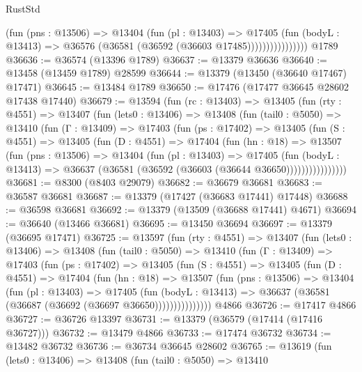 \begin{lexlean}{RustStd}
\begin{coremodule}
                        (fun (pns : @13506) =>
                        @13404
                          (fun (pl : @13403) =>
                          @17405
                            (fun (bodyL : @13413) =>
                            @36576 (@36581 (@36592 (@36603 @17485))))))))))))))))
    @1789
@36636 := @36574 (@13396 @1789)
@36637 := @13379 @36636
@36640 := @13458 (@13459 @1789) @28599
@36644 := @13379 (@13450 (@36640 @17467) @17471)
@36645 := @13484 @1789
@36650 := @17476 (@17477 @36645 @28602 @17438 @17440)
@36679 := @13594
    (fun (rc : @13403) =>
    @13405
      (fun (rty : @4551) =>
      @13407
        (fun (lets0 : @13406) =>
        @13408
          (fun (tail0 : @5050) =>
          @13410
            (fun (Γ : @13409) =>
            @17403
              (fun (ps : @17402) =>
              @13405
                (fun (S : @4551) =>
                @13405
                  (fun (D : @4551) =>
                  @17404
                    (fun (hn : @18) =>
                    @13507
                      (fun (pns : @13506) =>
                      @13404
                        (fun (pl : @13403) =>
                        @17405
                          (fun (bodyL : @13413) =>
                          @36637 (@36581 (@36592 (@36603 (@36644 @36650))))))))))))))))
@36681 := @8300 (@8403 @29079)
@36682 := @36679 @36681
@36683 := @36587 @36681
@36687 := @13379 (@17427 (@36683 @17441) @17448)
@36688 := @36598 @36681
@36692 := @13379 (@13509 (@36688 @17441) @4671)
@36694 := @36640 (@13466 @36681)
@36695 := @13450 @36694
@36697 := @13379 (@36695 @17471)
@36725 := @13597
    (fun (rty : @4551) =>
    @13407
      (fun (lets0 : @13406) =>
      @13408
        (fun (tail0 : @5050) =>
        @13410
          (fun (Γ : @13409) =>
          @17403
            (fun (ps : @17402) =>
            @13405
              (fun (S : @4551) =>
              @13405
                (fun (D : @4551) =>
                @17404
                  (fun (hn : @18) =>
                  @13507
                    (fun (pns : @13506) =>
                    @13404
                      (fun (pl : @13403) =>
                      @17405
                        (fun (bodyL : @13413) =>
                        @36637 (@36581 (@36687 (@36692 (@36697 @36650)))))))))))))))
    @4866
@36726 := @17417 @4866
@36727 := @36726 @13397
@36731 := @13379 (@36579 (@17414 (@17416 @36727)))
@36732 := @13479 @4866
@36733 := @17474 @36732
@36734 := @13482 @36732
@36736 := @36734 @36645 @28602
@36765 := @13619
    (fun (lets0 : @13406) =>
    @13408
      (fun (tail0 : @5050) =>
      @13410

\end{coremodule}
\end{lexlean}
